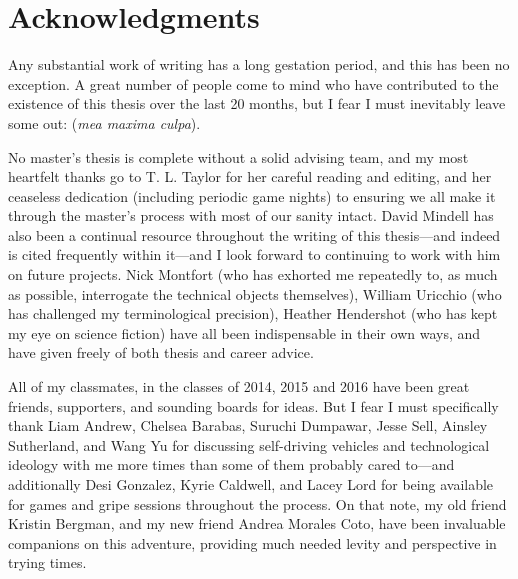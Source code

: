 \cleardoublepage
\setcounter{savepage}{\thepage}
\begin{abstractpage}

\end{abstractpage}

% 

\cleardoublepage

\section*{Acknowledgments}

Any substantial work of writing has a long gestation period, and this
has been no exception. A great number of people come to mind who have
contributed to the existence of this thesis over the last 20 months,
but I fear I must 
inevitably leave some out:  (\emph{mea maxima culpa}). 

No master's thesis is complete without a
solid advising team, and my most heartfelt thanks go to T. L. Taylor
for her careful reading and editing, and her ceaseless dedication (including periodic
game nights) to ensuring we all make it through the master's process with most of our
sanity intact. David Mindell has also been a continual resource
throughout the writing of this thesis---and indeed is cited frequently
within it---and I look forward to continuing to work with him on
future projects. Nick Montfort (who has exhorted me repeatedly to, as
much as possible, interrogate the technical objects themselves),
William Uricchio (who has challenged my terminological precision),
Heather Hendershot (who has kept my eye on science fiction) have all
been indispensable in their own ways, and have given freely of both
thesis and career advice.

All of my classmates, in the classes of 2014, 2015 and 2016 have been great
friends, supporters, and sounding boards for ideas. But I fear I must
specifically thank Liam Andrew, Chelsea Barabas, Suruchi Dumpawar,
Jesse Sell, Ainsley Sutherland, and Wang Yu for discussing
self-driving vehicles and technological ideology with me 
more times than some of them probably cared to---and additionally Desi
Gonzalez, Kyrie Caldwell, and Lacey Lord for being available for
games and gripe sessions throughout the process. On that note, my old
friend Kristin Bergman, and my new friend Andrea Morales Coto, have
been invaluable companions on this adventure, providing much needed
levity and perspective in trying times.

